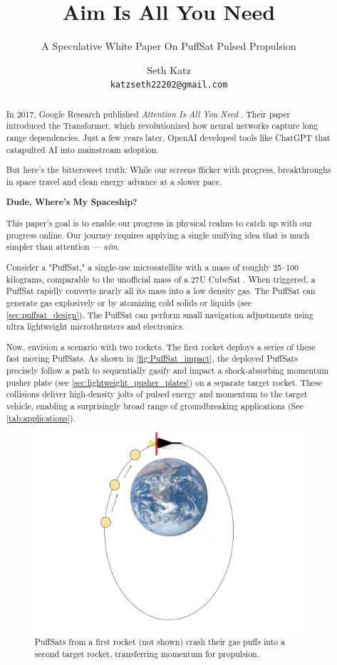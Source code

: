 \documentclass{article}
\title{Aim Is All You Need}
\subtitle{A Speculative White Paper On PuffSat Pulsed Propulsion}
\author{
  Seth Katz \\
  \texttt{katzseth22202@gmail.com} \\
}
\begin{document}
\maketitle

\newpage
\tableofcontents
\newpage

\begin{abstract}\label{sec:abstract}
 
In 2017, Google Research published \textit{Attention Is All You Need} \cite{vaswani2023attentionneed}.  Their paper introduced the Transformer, which revolutionized how neural networks capture long range dependencies.   Just a few years later, OpenAI developed tools like ChatGPT \cite{chatgpt} that catapulted AI into mainstream adoption.

But here's the bittersweet truth:  While our screens flicker with progress, breakthroughs in space travel and clean energy advance at a slower pace.

\textbf{Dude, Where's My Spaceship?}

This paper's goal is to enable our progress in physical realms to catch up with our progress online.  Our journey requires applying a single unifying idea that is much simpler than attention --- \textit{aim}.   

Consider a "PuffSat," a single-use microsatellite with a mass of roughly 25–100 kilograms, comparable to the unofficial mass of a 27U CubeSat \cite{cubesat_27u}.  When triggered, a PuffSat rapidly converts nearly all its mass into a low density gas.  The PuffSat can generate gas explosively or by atomizing cold solids or liquids (see \autoref{sec:puffsat_design}).  The PuffSat can perform small navigation adjustments using ultra lightweight microthrusters and electronics.

Now, envision a scenario with two rockets. The first rocket deploys a series of these fast moving PuffSats. As shown in \autoref{fig:PuffSat_impact}, the deployed PuffSats precisely follow a path to sequentially gasify and impact a shock-absorbing momentum pusher plate (see \autoref{sec:lightweight_pusher_plates}) on a separate target rocket. These collisions deliver high-density jolts of pulsed energy and momentum to the target vehicle, enabling a surprisingly broad range of groundbreaking applications (See \autoref{tab:applications}). 

\begin{figure}[htpb]
    \centering
    \includegraphics[width=0.5\linewidth]{images/Starship_Impact_ellipse.png}
    \caption{PuffSats from a first rocket (not shown) crash their gas puffs into a second target rocket, transferring momentum for propulsion. \cite{earth_image}}
    \label{fig:PuffSat_impact}
\end{figure}


\end{abstract}
\end{document}
